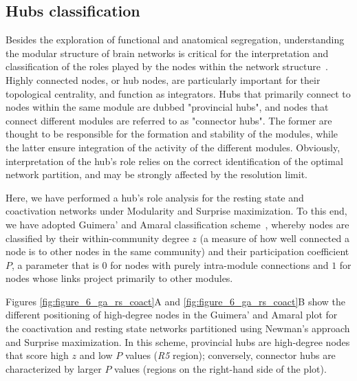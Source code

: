 \subsection{Hubs classification}
Besides the exploration of functional and anatomical segregation, understanding the modular structure of brain networks is critical for the interpretation and classification of the roles played by the nodes within the network structure~\cite{sporns2007}. Highly connected nodes, or hub nodes, are particularly important for their topological centrality, and function as integrators. Hubs that primarily connect to nodes within the same module are dubbed "provincial hubs", and nodes that connect different modules are referred to as "connector hubs". The former are thought to be responsible for the formation and stability of the modules, while the latter ensure integration of the activity of the different modules. Obviously, interpretation of the hub's role relies on the correct identification of the optimal network partition, and may be strongly affected by the resolution limit.

Here, we have performed a hub's role analysis for the resting state and coactivation networks under Modularity and Surprise maximization.
To this end, we have adopted Guimera' and Amaral classification scheme~\cite{guimera2005}, whereby nodes are classified by their within-community degree $z$ (a measure of how well connected a node is to other nodes in the same community) and their participation coefficient $P$, a parameter that is $0$ for nodes with purely intra-module connections and $1$ for nodes whose links project primarily to other modules. 

Figures \ref{fig:figure_6_ga_rs_coact}A and \ref{fig:figure_6_ga_rs_coact}B show the different positioning of high-degree nodes in the Guimera' and Amaral plot for the coactivation and resting state networks partitioned using Newman’s approach and Surprise maximization. In this scheme, provincial hubs are high-degree nodes that score high $z$ and low $P$ values (\emph{R5} region); conversely, connector hubs are characterized by larger $P$ values (regions on the right-hand side of the plot).

